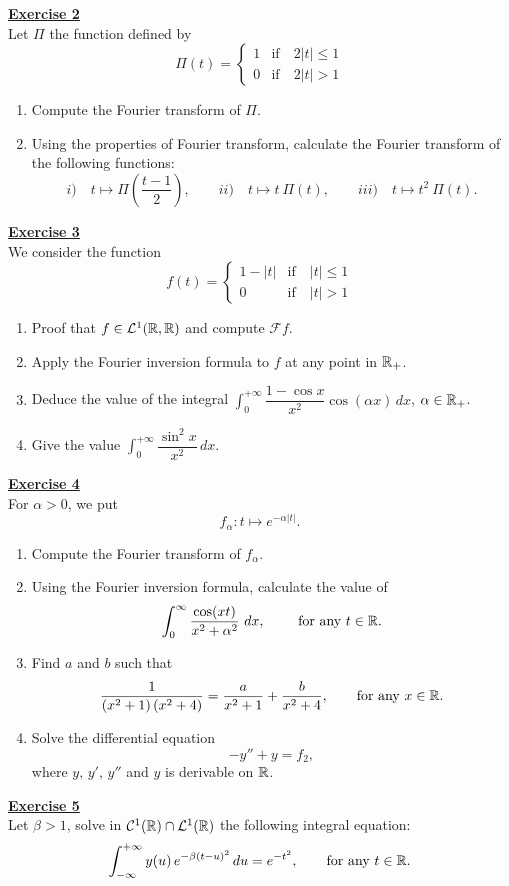 \noindent\Large{\underline{\textbf{Exercise 2}}}
\normalsize{}\\
\noindent Let $\Pi$ the function defined by
$$\Pi(t) = \begin{cases} 1 & \text{if} \quad 2|t| \leq 1 \\ 0 & \text{if} \quad 2|t| > 1 \end{cases}$$
\begin{enumerate}
    \item Compute the Fourier transform of $\Pi$.
    \item Using the properties of Fourier transform, calculate the Fourier transform of the following functions:
        $$i)\quad t \longmapsto \Pi\!\left(\dfrac{t-1}{2}\right), \qquad ii)\quad t \longmapsto t\ \Pi(t), \qquad 
            iii)\quad t \longmapsto t^2\ \Pi(t).$$
\end{enumerate}

\noindent\Large{\underline{\textbf{Exercise 3}}}
\normalsize{}\\
\noindent We consider the function
$$f(t) = \begin{cases} 1 - |t| & \text{if} \quad |t| \leq 1 \\ 0 & \text{if} \quad |t| > 1 \end{cases}$$
\begin{enumerate}
    \item Proof that $f \in \mathcal{L}^1(\mathbb{R}, \mathbb{R})$ and compute $\mathcal{F}f$.
    \item Apply the Fourier inversion formula to $f$ at any point in $\mathbb{R}_+$.
    \item Deduce the value of the integral 
            $\displaystyle\int_0^{+\infty} \dfrac{1 - \cos x}{x^2}\cos(\alpha x)\, dx$, $\alpha\in\mathbb{R}_+$.\\
    \item Give the value $\displaystyle\int_0^{+\infty} \dfrac{\sin^2 x}{x^2}\, dx.$
\end{enumerate}
\newpage
\vspace*{0.2cm}
\noindent\Large{\underline{\textbf{Exercise 4}}}
\normalsize{}\\
\noindent For $\alpha > 0$, we put $$f_\alpha : t \longmapsto e^{-\alpha|t|}.$$
\begin{enumerate}
    \item Compute the Fourier transform of $f_\alpha$.
    \item Using the Fourier inversion formula, calculate the value of
          $$\int_0^\infty \dfrac{\cos(xt)}{x^2 + \alpha^2}\ dx, \qquad \text{ for any } t\in\R.$$
    \item Find $a$ and $b$ such that
          $$ \dfrac{1}{\left(x^2 + 1\right)\left(x^2 + 4\right)} = \dfrac{a}{x^2+1} + \dfrac{b}{x^2+4}, \qquad 
          \text{for any } x \in \mathbb{R}.$$
    \item Solve the differential equation
          $$-y'' + y = f_2,$$
          where $y,\, y',\, y''$ and $y$ is derivable on $\mathbb{R}$.\\
\end{enumerate}

\noindent\Large{\underline{\textbf{Exercise 5}}}
\normalsize{}\\
\noindent Let $\beta > 1$, solve in $\mathcal{C}^1(\mathbb{R}) \cap \mathcal{L}^1(\mathbb{R})$ the following integral equation:
$$\int_{-\infty}^{+\infty} y(u)\, e^{-\beta(t-u)^2}\, du = e^{-t^2}, \qquad \text{for any } t \in \mathbb{R}.$$
